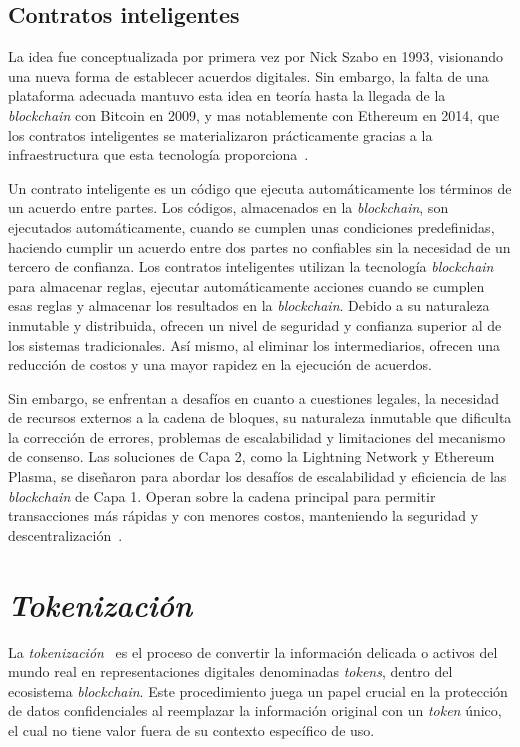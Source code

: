 \subsection{Contratos inteligentes}

La idea fue conceptualizada por primera vez por Nick Szabo en 1993, visionando una nueva forma de establecer acuerdos digitales. Sin embargo, la falta de una plataforma adecuada mantuvo esta idea en teoría hasta la llegada de la \textit{blockchain} con Bitcoin en 2009, y mas notablemente con Ethereum en 2014, que los contratos inteligentes se materializaron prácticamente gracias a la infraestructura que esta tecnología proporciona~\cite{smartcontractHistoria}.

Un contrato inteligente es un código que ejecuta automáticamente los términos de un acuerdo entre partes. Los códigos, almacenados en la \textit{blockchain}, son ejecutados automáticamente, cuando se cumplen unas condiciones predefinidas, haciendo cumplir un acuerdo entre dos partes no confiables sin la necesidad de un tercero de confianza.
Los contratos inteligentes utilizan la tecnología \textit{blockchain} para almacenar reglas, ejecutar automáticamente acciones cuando se cumplen esas reglas y almacenar los resultados en la \textit{blockchain}. Debido a su naturaleza inmutable y distribuida, ofrecen un nivel de seguridad y confianza superior al de los sistemas tradicionales. Así mismo, al eliminar los intermediarios, ofrecen una reducción de costos y una mayor rapidez en la ejecución de acuerdos.

Sin embargo, se enfrentan a desafíos en cuanto a cuestiones legales, la necesidad de recursos externos a la cadena de bloques, su naturaleza inmutable que dificulta la corrección de errores, problemas de escalabilidad y limitaciones del mecanismo de consenso. Las soluciones de Capa 2, como la Lightning Network y Ethereum Plasma, se diseñaron para abordar los desafíos de escalabilidad y eficiencia de las \textit{blockchain} de Capa 1. Operan sobre la cadena principal para permitir transacciones más rápidas y con menores costos, manteniendo la seguridad y descentralización~\cite{AplicacionesDesafiosSmartcontract}.



\section{\textit{Tokenización}}

La \textit{tokenización}~\cite{tokenización} es el proceso de convertir la información delicada o activos del mundo real en representaciones digitales denominadas \textit{tokens}, dentro del ecosistema \textit{blockchain}.
Este procedimiento juega un papel crucial en la protección de datos confidenciales al reemplazar la información original con un \textit{token} único, el cual no tiene valor fuera de su contexto específico de uso.

